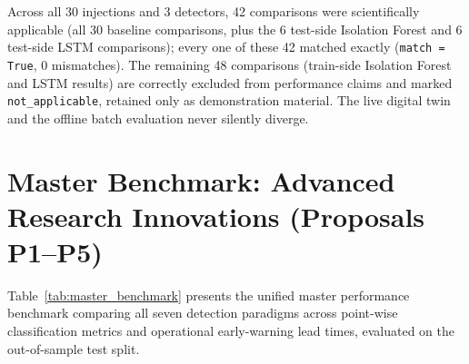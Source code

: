 \documentclass[11pt,a4paper,oneside]{report}
\begin{document}
\begin{keyfinding}
Across all 30 injections and 3 detectors, 42 comparisons were scientifically applicable (all 30 baseline comparisons, plus the 6 test-side Isolation Forest and 6 test-side LSTM comparisons); every one of these 42 matched exactly (\texttt{match = True}, 0 mismatches). The remaining 48 comparisons (train-side Isolation Forest and LSTM results) are correctly excluded from performance claims and marked \texttt{not\_applicable}, retained only as demonstration material. The live digital twin and the offline batch evaluation never silently diverge.
\end{keyfinding}

\section{Master Benchmark: Advanced Research Innovations (Proposals P1--P5)}
\label{sec:res_master_benchmark}

Table~\ref{tab:master_benchmark} presents the unified master performance benchmark comparing all seven detection paradigms across point-wise classification metrics and operational early-warning lead times, evaluated on the out-of-sample test split.

\begin{table}[H]
\centering
\caption{Master Performance Benchmark across all seven detection paradigms on the chronological test split. All metrics evaluated out-of-sample in accordance with AD Log D26.}
\label{tab:master_benchmark}
\small
{}
\end{table}
\end{document}
